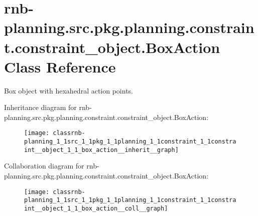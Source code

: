 \hypertarget{classrnb-planning_1_1src_1_1pkg_1_1planning_1_1constraint_1_1constraint__object_1_1_box_action}{}\section{rnb-\/planning.src.\+pkg.\+planning.\+constraint.\+constraint\+\_\+object.\+Box\+Action Class Reference}
\label{classrnb-planning_1_1src_1_1pkg_1_1planning_1_1constraint_1_1constraint__object_1_1_box_action}


Box object with hexahedral action points.  




Inheritance diagram for rnb-\/planning.src.\+pkg.\+planning.\+constraint.\+constraint\+\_\+object.\+Box\+Action\+:
\nopagebreak
\begin{figure}[H]
\begin{center}
\leavevmode
\texttt{[image: classrnb-planning\_1\_1src\_1\_1pkg\_1\_1planning\_1\_1constraint\_1\_1constraint\_\_object\_1\_1\_box\_action\_\_inherit\_\_graph]}
\end{center}
\end{figure}


Collaboration diagram for rnb-\/planning.src.\+pkg.\+planning.\+constraint.\+constraint\+\_\+object.\+Box\+Action\+:
\nopagebreak
\begin{figure}[H]
\begin{center}
\leavevmode
\texttt{[image: classrnb-planning\_1\_1src\_1\_1pkg\_1\_1planning\_1\_1constraint\_1\_1constraint\_\_object\_1\_1\_box\_action\_\_coll\_\_graph]}
\end{center}
\end{figure}
